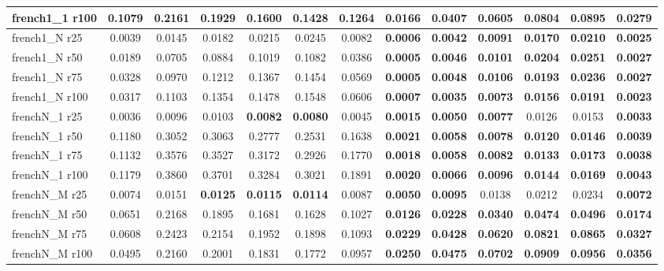 \begin{table}[t]
{\begin{tabular}{l||cccccc||cccccc}
french1\_1 r100 & 0.1079 & 0.2161 & 0.1929 & 0.1600 & 0.1428 & 0.1264 & \textbf{0.0166} & \textbf{0.0407} & \textbf{0.0605} & \textbf{0.0804} & \textbf{0.0895} & \textbf{0.0279} \\
\hline
french1\_N r25 & 0.0039 & 0.0145 & 0.0182 & 0.0215 & 0.0245 & 0.0082 & \textbf{0.0006} & \textbf{0.0042} & \textbf{0.0091} & \textbf{0.0170} & \textbf{0.0210} & \textbf{0.0025} \\
french1\_N r50 & 0.0189 & 0.0705 & 0.0884 & 0.1019 & 0.1082 & 0.0386 & \textbf{0.0005} & \textbf{0.0046} & \textbf{0.0101} & \textbf{0.0204} & \textbf{0.0251} & \textbf{0.0027} \\
french1\_N r75 & 0.0328 & 0.0970 & 0.1212 & 0.1367 & 0.1454 & 0.0569 & \textbf{0.0005} & \textbf{0.0048} & \textbf{0.0106} & \textbf{0.0193} & \textbf{0.0236} & \textbf{0.0027} \\
french1\_N r100 & 0.0317 & 0.1103 & 0.1354 & 0.1478 & 0.1548 & 0.0606 & \textbf{0.0007} & \textbf{0.0035} & \textbf{0.0073} & \textbf{0.0156} & \textbf{0.0191} & \textbf{0.0023} \\
\hline
frenchN\_1 r25 & 0.0036 & 0.0096 & 0.0103 & \textbf{0.0082} & \textbf{0.0080} & 0.0045 & \textbf{0.0015} & \textbf{0.0050} & \textbf{0.0077} & 0.0126 & 0.0153 & \textbf{0.0033} \\
frenchN\_1 r50 & 0.1180 & 0.3052 & 0.3063 & 0.2777 & 0.2531 & 0.1638 & \textbf{0.0021} & \textbf{0.0058} & \textbf{0.0078} & \textbf{0.0120} & \textbf{0.0146} & \textbf{0.0039} \\
frenchN\_1 r75 & 0.1132 & 0.3576 & 0.3527 & 0.3172 & 0.2926 & 0.1770 & \textbf{0.0018} & \textbf{0.0058} & \textbf{0.0082} & \textbf{0.0133} & \textbf{0.0173} & \textbf{0.0038} \\
frenchN\_1 r100 & 0.1179 & 0.3860 & 0.3701 & 0.3284 & 0.3021 & 0.1891 & \textbf{0.0020} & \textbf{0.0066} & \textbf{0.0096} & \textbf{0.0144} & \textbf{0.0169} & \textbf{0.0043} \\
\hline
frenchN\_M r25 & 0.0074 & 0.0151 & \textbf{0.0125} & \textbf{0.0115} & \textbf{0.0114} & 0.0087 & \textbf{0.0050} & \textbf{0.0095} & 0.0138 & 0.0212 & 0.0234 & \textbf{0.0072} \\
frenchN\_M r50 & 0.0651 & 0.2168 & 0.1895 & 0.1681 & 0.1628 & 0.1027 & \textbf{0.0126} & \textbf{0.0228} & \textbf{0.0340} & \textbf{0.0474} & \textbf{0.0496} & \textbf{0.0174} \\
frenchN\_M r75 & 0.0608 & 0.2423 & 0.2154 & 0.1952 & 0.1898 & 0.1093 & \textbf{0.0229} & \textbf{0.0428} & \textbf{0.0620} & \textbf{0.0821} & \textbf{0.0865} & \textbf{0.0327} \\
frenchN\_M r100 & 0.0495 & 0.2160 & 0.2001 & 0.1831 & 0.1772 & 0.0957 & \textbf{0.0250} & \textbf{0.0475} & \textbf{0.0702} & \textbf{0.0909} & \textbf{0.0956} & \textbf{0.0356} \\
\hline
\end{tabular}%
}
\end{table}
